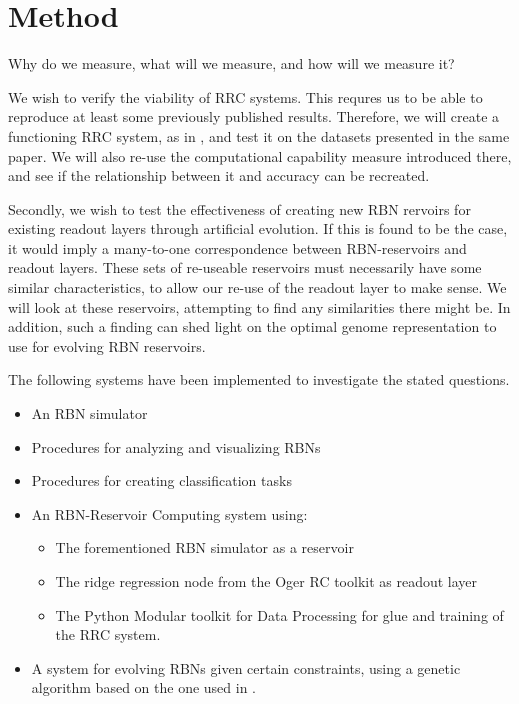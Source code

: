 \section{Method}

Why do we measure, what will we measure, and how will we measure it?

We wish to verify the viability of RRC systems.
This requres us to be able to reproduce at least some previously published results.
Therefore, we will create a functioning RRC system, as in \cite{rbn-reservoir},
and test it on the datasets presented in the same paper.
We will also re-use the computational capability measure introduced there,
and see if the relationship between it and accuracy can be recreated.

Secondly, we wish to test the effectiveness of creating new RBN rervoirs for existing readout layers through artificial evolution.
If this is found to be the case, it would imply a many-to-one correspondence between RBN-reservoirs and readout layers.
These sets of re-useable  reservoirs must necessarily have some similar characteristics,
to allow our re-use of the readout layer to make sense.
We will look at these reservoirs, attempting to find any similarities there might be.
In addition, such a finding can shed light on the optimal genome representation to use for evolving RBN reservoirs.

The following systems have been implemented to investigate the stated questions.

\begin{itemize}
  \item An RBN simulator
  \item Procedures for analyzing and visualizing RBNs
  \item Procedures for creating classification tasks

  \item An RBN-Reservoir Computing system using:
  \begin{itemize}
    \item The forementioned RBN simulator as a reservoir
    \item The ridge regression node from the Oger RC toolkit \cite{verstraeten2012oger} as readout layer
    \item The Python Modular toolkit for Data Processing \cite{zito2008modular} for glue and training of the RRC system.
  \end{itemize}
  \item A system for evolving RBNs given certain constraints, using a genetic algorithm based on the one used in \cite{farstad2015evolving}.
\end{itemize}

